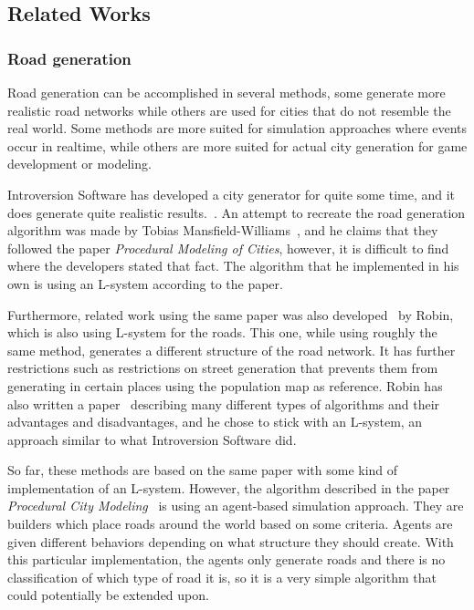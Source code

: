 \subsection{Related Works}

\subsubsection{Road generation}
Road generation can be accomplished in several methods, some generate more realistic road networks while others are used for cities that do not resemble the real world.
Some methods are more suited for simulation approaches where events occur in realtime, while others are more suited for actual city generation for game development or modeling.

Introversion Software has developed a city generator for quite some time, and it does generate quite realistic results.~\cite{citygen_subversion}.
An attempt to recreate the road generation algorithm was made by Tobias Mansfield-Williams~\cite{citygen_tobias}, and he claims that they followed the paper \textit{Procedural Modeling of Cities}, however, it is difficult to find where the developers stated that fact.
The algorithm that he implemented in his own is using an L-system according to the paper.

Furthermore, related work using the same paper was also developed~\cite{citygen_robin} by Robin, which is also using L-system for the roads. This one, while using roughly the same method, generates a different structure of the road network. It has further restrictions such as restrictions on street generation that prevents them from generating in certain places using the population map as reference.
Robin has also written a paper~\cite{citygen_robin_paper} describing many different types of algorithms and their advantages and disadvantages, and he chose to stick with an L-system, an approach similar to what Introversion Software did.

So far, these methods are based on the same paper with some kind of implementation of an L-system.
However, the algorithm described in the paper \textit{Procedural City Modeling}~\cite{citygen_lechner} is using an agent-based simulation approach. They are builders which place roads around the world based on some criteria. Agents are given different behaviors depending on what structure they should create.
With this particular implementation, the agents only generate roads and there is no classification of which type of road it is, so it is a very simple algorithm that could potentially be extended upon.
